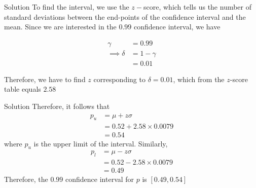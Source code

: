 \documentclass{beamer}
\begin{document}
\begin{frame}{Solution}
    To find the interval, we use the $z-$score, which tells us the number of standard deviations between the end-points of the confidence interval and the mean.
    Since we are interested in the $0.99$ confidence interval, we have
    
     \begin{align}
     \gamma &= 0.99 \\ 
     \implies \delta &= 1 - \gamma \\
     &= 0.01 
 \end{align}
 
 Therefore, we have to find $z$ corresponding to $\delta = 0.01$, which from the $z$-score table equals $2.58$
    
\end{frame}


\begin{frame}{Solution}
    Therefore, it follows that
    \begin{align}
        p_u &= \mu + z\sigma \\
        &= 0.52 + 2.58 \times 0.0079 \\
        &= 0.54
    \end{align}
    where $p_u$ is the upper limit of the interval. Similarly, 
    \begin{align}
        p_l &= \mu - z\sigma \\
        &= 0.52 - 2.58 \times 0.0079 \\
        &= 0.49
    \end{align}
    Therefore, the $0.99$ confidence interval for $p$ is $[0.49,0.54]$
\end{frame}
\end{document}
